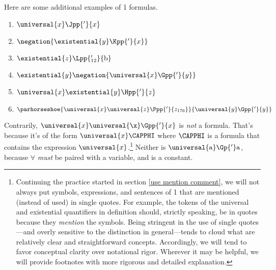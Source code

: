 Here are some additional examples of \GQL{}1 formulas. 
\begin{multicols}{2}
\begin{enumerate}
\item $\universal{\variable{x}}\Jpp{'}{\variable{x}}$ 
\item $\negation{\existential{\variable{y}}\Kpp{'}{\variable{x}}}$ 
\item $\existential{\variable{z}}\Lpp{'_{12}}{\constant{b}}$
\item $\existential{\variable{y}}\negation{\universal{\variable{x}}\Gpp{'}{\variable{y}}}$ 
\item $\universal{\variable{x}}\existential{\variable{y}}\Hpp{'}{\variable{z}}$ 
\item $\parhorseshoe{\universal{\variable{x}}\universal{\variable{z}}\Ppp{'}{\variable{z}_{176}}}{\universal{\variable{y}}\Gpp{'}{\variable{y}}}$ 
\end{enumerate}
\end{multicols}
\noindent{}Contrarily, $\universal{\variable{x}}\universal{\x}\Gpp{'}{\variable{x}}$ is \emph{not} a formula.  That's because it's of the form $\universal{\variable{x}}\CAPPHI$ where $\CAPPHI$ is a formula that contains the expression $\universal{\variable{x}}$.\footnote{Continuing the practice started in section \ref{use mention comment}, we will not always put symbols, expressions, and sentences of \GQL{}1 that are mentioned (instead of used) in single quotes. 
For example, the tokens of the universal and existential quantifiers in definition  should, strictly speaking, be in quotes because they \emph{mention} the symbols. 
Being stringent in the use of single quotes---and overly sensitive to the  distinction in general---tends to cloud what are relatively clear and straightforward concepts.  Accordingly, we will tend to favor conceptual clarity over notational rigor. 
Wherever it may be helpful, we will provide footnotes with more rigorous and detailed explanation.} Neither is $\universal{\constant{a}}\Gp{'}\constant{a}$, because $\forall$ \emph{must} be paired with a variable, and  is a constant.

